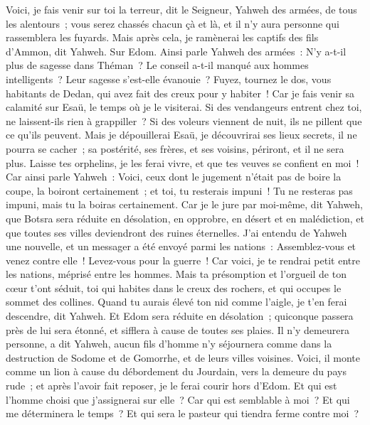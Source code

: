 \begin{multicols}{2}
Voici, je fais venir sur toi la terreur, dit le Seigneur, Yahweh des armées, de tous les alentours~; vous serez chassés chacun çà et là, et il n'y aura personne qui rassemblera les fuyards.
Mais après cela, je ramènerai les captifs des fils d'Ammon, dit Yahweh.
Sur Edom. Ainsi parle Yahweh des armées~: N'y a-t-il plus de sagesse dans Théman~? Le conseil a-t-il manqué aux hommes intelligents~? Leur sagesse s'est-elle évanouie~?
Fuyez, tournez le dos, vous habitants de Dedan, qui avez fait des creux pour y habiter~! Car je fais venir sa calamité sur Esaü, le temps où je le visiterai.
Si des vendangeurs entrent chez toi, ne laissent-ils rien à grappiller~? Si des voleurs viennent de nuit, ils ne pillent que ce qu'ils peuvent.
Mais je dépouillerai Esaü, je découvrirai ses lieux secrets, il ne pourra se cacher~; sa postérité, ses frères, et ses voisins, périront, et il ne sera plus.
Laisse tes orphelins, je les ferai vivre, et que tes veuves se confient en moi~!
Car ainsi parle Yahweh~: Voici, ceux dont le jugement n'était pas de boire la coupe, la boiront certainement~; et toi, tu resterais impuni~! Tu ne resteras pas impuni, mais tu la boiras certainement.
Car je le jure par moi-même, dit Yahweh, que Botsra sera réduite en désolation, en opprobre, en désert et en malédiction, et que toutes ses villes deviendront des ruines éternelles.
J'ai entendu de Yahweh une nouvelle, et un messager a été envoyé parmi les nations~: Assemblez-vous et venez contre elle~! Levez-vous pour la guerre~!
Car voici, je te rendrai petit entre les nations, méprisé entre les hommes.
Mais ta présomption et l'orgueil de ton cœur t'ont séduit, toi qui habites dans le creux des rochers, et qui occupes le sommet des collines. Quand tu aurais élevé ton nid comme l'aigle, je t'en ferai descendre, dit Yahweh.
Et Edom sera réduite en désolation~; quiconque passera près de lui sera étonné, et sifflera à cause de toutes ses plaies.
Il n'y demeurera personne, a dit Yahweh, aucun fils d'homme n'y séjournera comme dans la destruction de Sodome et de Gomorrhe, et de leurs villes voisines.
Voici, il monte comme un lion à cause du débordement du Jourdain, vers la demeure du pays rude~; et après l'avoir fait reposer, je le ferai courir hors d'Edom. Et qui est l'homme choisi que j'assignerai sur elle~? Car qui est semblable à moi~? Et qui me déterminera le temps~? Et qui sera le pasteur qui tiendra ferme contre moi~?

\end{multicols}
